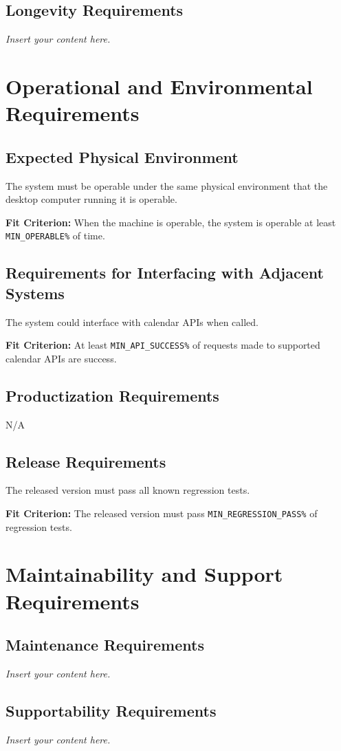 \documentclass[12pt]{article}
\newcommand{\lips}{\textit{Insert your content here.}}
\begin{document}
\subsection{Longevity Requirements}
\lips

\section{Operational and Environmental Requirements}
\subsection{Expected Physical Environment}
The system must be operable under the same physical environment that the desktop computer running it is operable.

\textbf{Fit Criterion:} When the machine is operable, the system is operable at least \texttt{MIN\_OPERABLE\%} of time.

\subsection{Requirements for Interfacing with Adjacent Systems}
The system could interface with calendar APIs when called.

\textbf{Fit Criterion:} At least \texttt{MIN\_API\_SUCCESS\%} of requests made to supported calendar APIs are success.
\subsection{Productization Requirements}
N/A
\subsection{Release Requirements}
The released version must pass all known regression tests.

\textbf{Fit Criterion:} The released version must pass \texttt{MIN\_REGRESSION\_PASS\%} of regression tests. 

\section{Maintainability and Support Requirements}
\subsection{Maintenance Requirements}
\lips
\subsection{Supportability Requirements}
\lips
\end{document}

